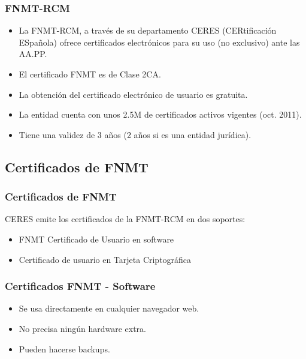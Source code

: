 \documentclass{beamer}
\begin{document}
\begin{frame}
\frametitle{FNMT-RCM}

\begin{itemize}
\item La FNMT-RCM, a través de su departamento \alert{CERES} (CERtificación ESpañola) ofrece certificados electrónicos para su uso (no exclusivo) ante las AA.PP.
\item El certificado FNMT es de Clase 2CA.
\item La obtención del certificado electrónico de usuario es gratuita.
\item La entidad cuenta con unos 2.5M de certificados activos vigentes (oct. 2011).
\item Tiene una validez de 3 años (2 años si es una entidad jurídica).
\end{itemize}

\end{frame}

\subsection{Certificados de FNMT}

\begin{frame}
\frametitle{Certificados de FNMT}

CERES emite los certificados de la FNMT-RCM en dos soportes:
\begin{itemize}
\item FNMT Certificado de Usuario en software
\item Certificado de usuario en Tarjeta Criptográfica
\end{itemize}

\end{frame}
 
 


\begin{frame}
\frametitle{Certificados FNMT - Software}

\begin{itemize}
\item Se usa directamente en cualquier navegador web. 
\item No precisa ningún hardware extra.
\item Pueden hacerse backups.
\end{itemize}

\end{frame}
\end{document}
